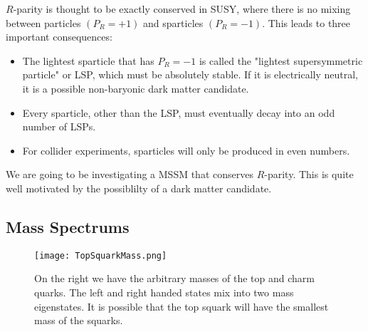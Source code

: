 $R$-parity is thought to be exactly conserved in SUSY, where there is no mixing between particles $(P_R=+1)$ and sparticles $(P_R=-1)$. This leads to three important consequences:
\begin{itemize}
	 \item The lightest sparticle that has $P_R=-1$ is called the "lightest supersymmetric particle" or LSP, which must be absolutely stable. If it is electrically neutral, it is a possible non-baryonic dark matter candidate.
	 \item Every sparticle, other than the LSP, must eventually decay into an odd number of LSPs.
	 \item For collider experiments, sparticles will only be produced in even numbers.
\end{itemize}
 We are going to be investigating a MSSM that conserves $R$-parity. This is quite well motivated by the possiblilty of a dark matter candidate. 

\subsection{Mass Spectrums}

\begin{figure}
\centering
	\texttt{[image: TopSquarkMass.png]}
 	\caption[Top squark mass hierarchy]{On the right we have the arbitrary masses of the top and charm quarks. The left and right handed states mix into two mass eigenstates. It is possible that the top squark will have the smallest mass of the squarks.}
 	\label{StopMass} 
\end{figure}


